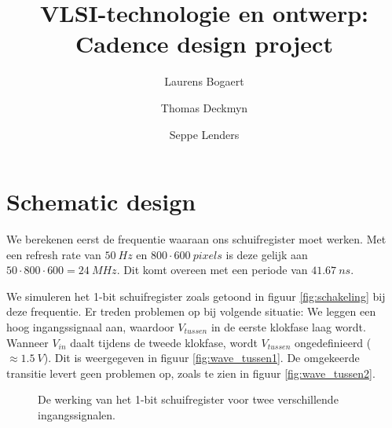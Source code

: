 \documentclass[11pt,a4paper,oneside,dutch]{article}
\author{Laurens Bogaert \and Thomas Deckmyn \and Seppe Lenders}
\title{VLSI-technologie en ontwerp: Cadence design project}
\date{\vspace{-5ex}} %
\begin{document}
\maketitle{}

\section{Schematic design}

We berekenen eerst de frequentie waaraan ons schuifregister moet werken. Met een refresh rate van $\SI{50}{Hz}$ en $800 \cdot \SI{600}{pixels}$ is deze gelijk aan $50 \cdot 800 \cdot 600 = \SI{24}{MHz}$. Dit komt overeen met een periode van $\SI{41,67}{ns}$.

We simuleren het 1-bit schuifregister zoals getoond in figuur \ref{fig:schakeling} bij deze frequentie. Er treden problemen op bij volgende situatie: We leggen een hoog ingangssignaal aan, waardoor $V_{tussen}$ in de eerste klokfase laag wordt. Wanneer $V_{in}$ daalt tijdens de tweede klokfase, wordt $V_{tussen}$ ongedefinieerd ($\approx \SI{1,5}{V}$). Dit is weergegeven in figuur \ref{fig:wave_tussen1}. De omgekeerde transitie levert geen problemen op, zoals te zien in figuur \ref{fig:wave_tussen2}.

\begin{figure}[htp]
	\centering
	\caption{De werking van het 1-bit schuifregister voor twee verschillende ingangssignalen.}
	\label{fig:wave_tussen}
\end{figure}
\end{document}
